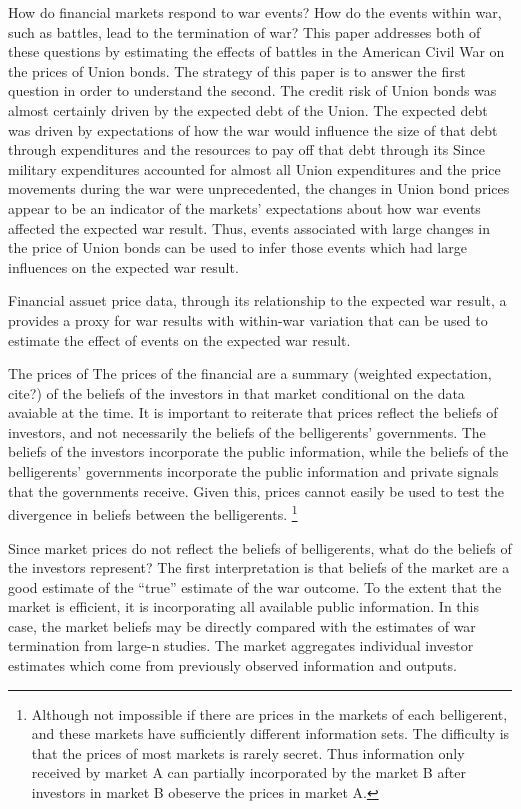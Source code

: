 How do financial markets respond to war events?
How do the events within war, such as battles, lead to the termination of war?
This paper addresses both of these questions by estimating the effects of battles in the American Civil War on the prices of Union bonds.
The strategy of this paper is to answer the first question in order to understand the second.
The credit risk of Union bonds was almost certainly driven by the expected debt of the Union.
The expected debt was driven by expectations of how the war would influence the size of that debt through expenditures and the resources to pay off that debt through its
Since military expenditures accounted for almost all Union expenditures and the price movements during the war were unprecedented, the changes in Union bond prices appear to be an indicator of the markets' expectations about how war events affected the expected war result.
Thus, events associated with large changes in the price of Union bonds can be used to infer those events which had large influences on the expected war result.

Financial assuet price data, through its relationship to the expected war result, a provides a proxy for war results with within-war variation that can be used to estimate the effect of events on the expected war result.


The prices of The prices of the financial are a summary (weighted expectation, cite?) of the beliefs of the investors in that market
conditional on the data avaiable at the time. It is important to
reiterate that prices reflect the beliefs of investors, and not
necessarily the beliefs of the belligerents' governments. The
beliefs of the investors incorporate the public information, while
the beliefs of the belligerents' governments incorporate the public
information and private signals that the governments receive. Given
this, prices cannot easily be used to test the divergence in beliefs
between the belligerents.%
\footnote{Although not impossible if there are prices in the markets
of each belligerent, and these markets have sufficiently different
information sets. The difficulty is that the prices of most markets
is rarely secret. Thus information only received by market A can
partially incorporated by the market B after investors in market B
obeserve the prices in market A.} %

Since market prices do not reflect the beliefs of belligerents, what
do the beliefs of the investors represent? The first interpretation is
that beliefs of the market are a good estimate of the ``true''
estimate of the war outcome. To the extent that the market is
efficient, it is incorporating all available public information.%
In this case, the market beliefs may be directly compared with the
estimates of war termination from large-n studies. The market
aggregates individual investor estimates which come from previously
observed information and outputs.

